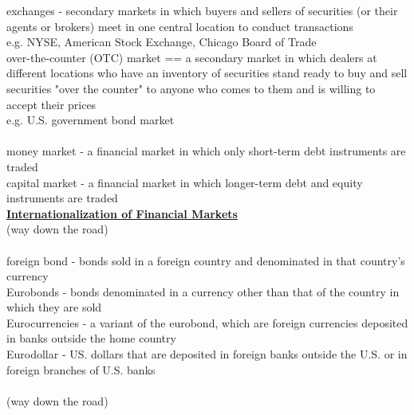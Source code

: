 \documentclass[12pt]{article}
\begin{document}
\noindent exchanges - secondary markets in which buyers and sellers of securities (or their agents or brokers) meet in one central location to conduct transactions\\
e.g. NYSE, American Stock Exchange, Chicago Board of Trade\\

\noindent over-the-counter (OTC) market == a secondary market in which dealers at different locations who have an inventory of securities stand ready to buy and sell securities "over the counter" to anyone who comes to them and is willing to accept their prices\\
e.g. U.S. government bond market\\

\\

\noindent money market - a financial market in which only short-term debt instruments are traded\\

\noindent capital market - a financial market in which longer-term debt and equity instruments are traded\\

\noindent \underline{\bf Internationalization of Financial Markets}\\

\noindent (way down the road) \\

\\

\noindent foreign bond - bonds sold in a foreign country and denominated in that country's currency\\

\noindent Eurobonds - bonds denominated in a currency other than that of the country in which they are sold\\

\noindent Eurocurrencies - a variant of the eurobond, which are foreign currencies deposited in banks outside the home country\\

\noindent Eurodollar - US. dollars that are deposited in foreign banks outside the U.S. or in foreign branches of U.S. banks\\

\\

\noindent (way down the road) \\
\end{document}
